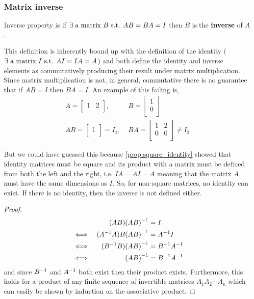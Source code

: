 \documentclass[MathsNotesBase.tex]{subfiles}
\begin{document}
{		\bigskip
		\subsubsection*{Matrix inverse}
		\begin{definition}
		Inverse property is if $ \exists \text{ a matrix } B \text{ s.t. } AB = BA = I $ then $B$ is the \textbf{inverse} of $A$.
		\end{definition}
		This definition is inherently bound up with the definition of the identity ($\exists \text{ a matrix } I \text{ s.t. } AI = IA = A$) and both define the identity and inverse elements as commutatively producing their result under matrix multiplication. Since matrix multiplication is not, in general, commutative there is no guarantee that if $AB = I$ then $BA = I$. An example of this failing is,
		\begin{align*}
			A = 
			\begin{bmatrix}
			1 & 2 \\
			\end{bmatrix},\;
			&B =
			\begin{bmatrix}
			1 \\
			0 \\
			\end{bmatrix}
			\\[10pt]
			AB = 
			\begin{bmatrix}
			1 \\
			\end{bmatrix} = I_1,\;
			&BA =
			\begin{bmatrix}
			1 & 2 \\
			0 & 0 \\
			\end{bmatrix} \neq I_2
		\end{align*}
		
		But we could have guessed this because \autoref{prop:square_identity} showed that identity matrices must be square and its product with a matrix must be defined from both the left and the right, i.e. $IA = AI = A$ meaning that the matrix $A$ must have the same dimensions as $I$. So, for non-square matrices, no identity can exist. If there is no identity, then the inverse is not defined either.
		
		\begin{proof}
		\begin{align*}
		& 	  &	(AB){(AB)}^{-1} &= I \\
		&\iff &	({A}^{-1}A)B{(AB)}^{-1} &= {A}^{-1}I \\
		&\iff &	({B}^{-1}B){(AB)}^{-1} &= {B}^{-1}{A}^{-1} \\
		&\iff &	{(AB)}^{-1} &= {B}^{-1}{A}^{-1} \\
		\end{align*}
		and since ${B}^{-1}$ and ${A}^{-1}$ both exist then their product exists.
		Furthermore, this holds for a product of any finite sequence of invertible matrices $A_1A_2\cdots A_n$ which can easily be shown by induction on the associative product.
		\end{proof}
	}
	
\end{document}
